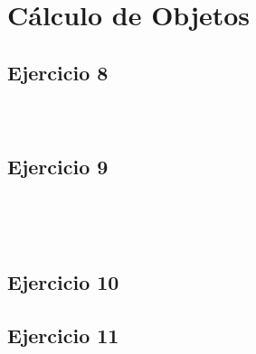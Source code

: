\documentclass[10pt,a4paper]{article}
\begin{document}
\section*{\centering Cálculo de Objetos}

\subsection{Ejercicio 8}
\subsubsection{}
    \begin{lstlisting}
    \end{lstlisting}
\subsubsection{}
    \begin{lstlisting}
    \end{lstlisting}
\subsection{Ejercicio 9}
\subsubsection{}
    \begin{lstlisting}
    \end{lstlisting}
\subsubsection{}
    \begin{lstlisting}
    \end{lstlisting}
\subsubsection{}
    \begin{lstlisting}
    \end{lstlisting}
\subsection{Ejercicio 10}
\subsection{Ejercicio 11}
\subsubsection{}
    \begin{lstlisting}
    \end{lstlisting}
\end{document}
